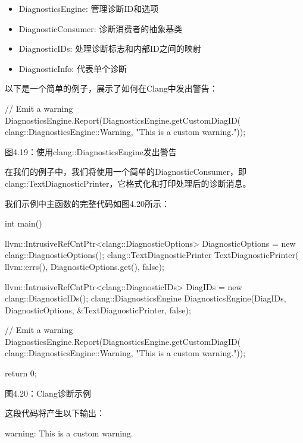 \begin{itemize}
\item
DiagnosticsEngine: 管理诊断ID和选项

\item
DiagnosticConsumer: 诊断消费者的抽象基类

\item
DiagnosticIDs: 处理诊断标志和内部ID之间的映射

\item
DiagnosticInfo: 代表单个诊断
\end{itemize}

以下是一个简单的例子，展示了如何在Clang中发出警告：

\begin{cpp}
// Emit a warning
DiagnosticsEngine.Report(DiagnosticsEngine.getCustomDiagID(
  clang::DiagnosticsEngine::Warning, "This is a custom warning."));
\end{cpp}

\begin{center}
图4.19：使用clang::DiagnosticsEngine发出警告
\end{center}

在我们的例子中，我们将使用一个简单的DiagnosticConsumer，即clang::TextDiagnosticPrinter，它格式化和打印处理后的诊断消息。

我们示例中主函数的完整代码如图4.20所示：

\begin{cpp}
int main() {
  llvm::IntrusiveRefCntPtr<clang::DiagnosticOptions> DiagnosticOptions =
    new clang::DiagnosticOptions();
  clang::TextDiagnosticPrinter TextDiagnosticPrinter(
    llvm::errs(), DiagnosticOptions.get(), false);

  llvm::IntrusiveRefCntPtr<clang::DiagnosticIDs> DiagIDs =
    new clang::DiagnosticIDs();
  clang::DiagnosticsEngine DiagnosticsEngine(DiagIDs, DiagnosticOptions,
                                             &TextDiagnosticPrinter, false);

  // Emit a warning
  DiagnosticsEngine.Report(DiagnosticsEngine.getCustomDiagID(
    clang::DiagnosticsEngine::Warning, "This is a custom warning."));

  return 0;
}
\end{cpp}

\begin{center}
图4.20：Clang诊断示例
\end{center}

这段代码将产生以下输出：

\begin{shell}
warning: This is a custom warning.
\end{shell}

